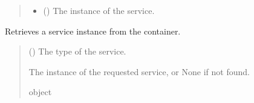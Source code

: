 \documentclass[letterpaper,10pt,english]{sphinxmanual}
\begin{document}
\begin{fulllineitems}
\begin{fulllineitems}
\begin{quote}
\begin{description}
\begin{itemize}
\item {} 
\sphinxAtStartPar
{} () \textendash{} The instance of the service.

\end{itemize}

\end{description}\end{quote}

\end{fulllineitems}


\begin{fulllineitems}
\label{\detokenize{DependencyContainer:DependencyContainer.DependencyContainer.get_service}}
\pysigstartsignatures
{}
\pysigstopsignatures
\sphinxAtStartPar
Retrieves a service instance from the container.
\begin{quote}\begin{description}
\sphinxAtStartPar
{} () \textendash{} The type of the service.

\sphinxAtStartPar
The instance of the requested service, or None if not found.

\sphinxAtStartPar
object

\end{description}\end{quote}

\end{fulllineitems}



\end{fulllineitems}
\end{document}
